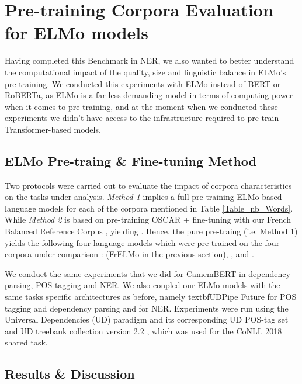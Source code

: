 \section{Pre-training Corpora Evaluation for ELMo models} \label{sect:EvalMethod}

Having completed this Benchmark in NER, we also wanted to better understand the computational impact of the quality, size and linguistic balance in ELMo's \citep{peters-etal-2018-deep} pre-training. We conducted this experiments with ELMo instead of BERT or RoBERTa, as ELMo is a far less demanding model in terms of computing power when it comes to pre-training, and at the moment when we conducted these experiments we didn't have access to the infrastructure required to pre-train Transformer-based models.

\subsection{ELMo Pre-traing \& Fine-tuning Method}\label{MethodTRAIN}

Two protocols were carried out to evaluate the impact of corpora characteristics on the tasks under analysis. \textit{Method 1} implies a full pre-training ELMo-based language models for each of the corpora mentioned in Table \ref{Table_nb_Words}. While \textit{Method 2} is based on pre-training OSCAR + fine-tuning with our French Balanced Reference Corpus \Cabernet, yielding \ELMocoscar. Hence, the pure pre-traing (i.e. Method 1) yields the following four language models which were pre-trained on the four corpora under comparison :  \ELMooscar (FrELMo in the previous section), \ELMowiki, \ELMococa and \ELMocbt.

We conduct the same experiments that we did for CamemBERT in dependency parsing, POS tagging and NER. We also coupled our ELMo models with the same tasks specific architectures as before, namely textbf{UDPipe Future} \citep{straka-2018-udpipe} for POS tagging and dependency parsing and \citep{strakova-etal-2019-neural} for NER. Experiments were run using the Universal Dependencies (UD) paradigm and its corresponding UD POS-tag set \citep{petrov-etal-2012-universal} and UD treebank collection version 2.2 \citep{nivre-etal-2018-universal}, which was used for the CoNLL 2018 shared task.

\subsection{Results \& Discussion} \label{sect:ResultsCorpora}


